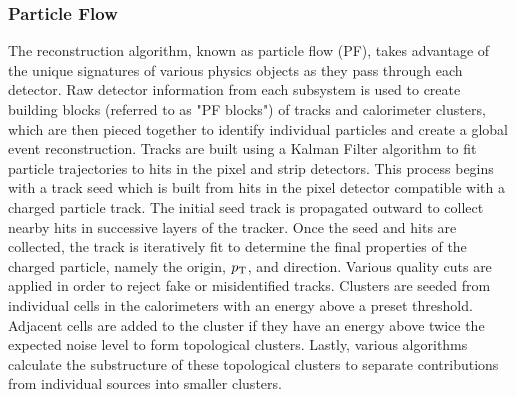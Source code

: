 \subsubsection{Particle Flow} \label{sec:CMS_PF}
The reconstruction algorithm, known as particle flow (PF), takes advantage of the unique signatures of various physics objects as they pass through each detector. Raw detector information from each subsystem is used to create building blocks (referred to as "PF blocks") of tracks and calorimeter clusters, which are then pieced together to identify individual particles and create a global event reconstruction. Tracks are built using a Kalman Filter algorithm to fit particle trajectories to hits in the pixel and strip detectors. This process begins with a track seed which is built from hits in the pixel detector compatible with a charged particle track. The initial seed track is propagated outward to collect nearby hits in successive layers of the tracker. Once the seed and hits are collected, the track is iteratively fit to determine the final properties of the charged particle, namely the origin, $p_\mathrm{T}$, and direction. Various quality cuts are applied in order to reject fake or misidentified tracks. Clusters are seeded from individual cells in the calorimeters with an energy above a preset threshold. Adjacent cells are added to the cluster if they have an energy above twice the expected noise level to form topological clusters. Lastly, various algorithms calculate the substructure of these topological clusters to separate contributions from individual sources into smaller clusters.